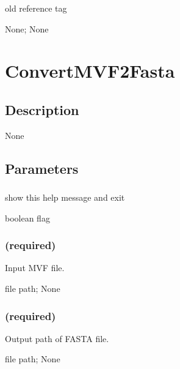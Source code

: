 \documentclass[letterpaper,11pt,english]{sphinxmanual}
\begin{document}
\subsubsection{}
\label{\detokenize{prog_desc:ref-tag-reftag}}
 old reference tag

 None;  None


\section{ConvertMVF2Fasta}
\label{\detokenize{prog_desc:convertmvf2fasta}}

\subsection{Description}
\label{\detokenize{prog_desc:id14}}
None


\subsection{Parameters}
\label{\detokenize{prog_desc:id15}}

\subsubsection{}
\label{\detokenize{prog_desc:id16}}
 show this help message and exit

 boolean flag


\subsubsection{ (required)}
\label{\detokenize{prog_desc:id17}}
 Input MVF file.

 file path;  None


\subsubsection{ (required)}
\label{\detokenize{prog_desc:id18}}
 Output path of FASTA file.

 file path;  None
\end{document}
